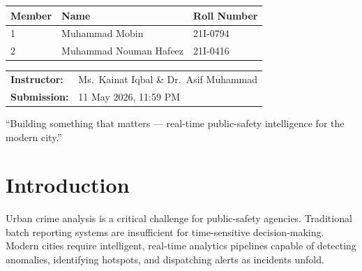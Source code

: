 \documentclass[12pt,a4paper]{article}
\begin{document}
\begin{titlepage}
\vspace{0.5cm}

\begin{center}
  \begin{tabular}{lll}
    \toprule
    \textbf{Member} & \textbf{Name} & \textbf{Roll Number}\\
    \midrule
    1 & Muhammad Mobin       & 21I-0794 \\
    2 & Muhammad Nouman Hafeez & 21I-0416 \\
    \bottomrule
  \end{tabular}
\end{center}

\vspace{0.6cm}

\begin{center}
  \begin{tabular}{ll}
    \textbf{Instructor:}  & Ms.\ Kainat Iqbal \& Dr.\ Asif Muhammad \\
    \textbf{Submission:}  & 11 May 2026, 11:59 PM \\
  \end{tabular}
\end{center}

\vfill
\begin{center}
  {\color{nuGold!60!black}\small
  ``Building something that matters — real-time public-safety intelligence for the modern city.''}
\end{center}
\vspace{0.3cm}

\end{titlepage}

\setcounter{page}{1}

\tableofcontents
\newpage

\setcounter{page}{1}

\section{Introduction}

Urban crime analysis is a critical challenge for public-safety agencies. Traditional batch reporting systems are insufficient for time-sensitive decision-making. Modern cities require intelligent, real-time analytics pipelines capable of detecting anomalies, identifying hotspots, and dispatching alerts as incidents unfold.
\end{document}
